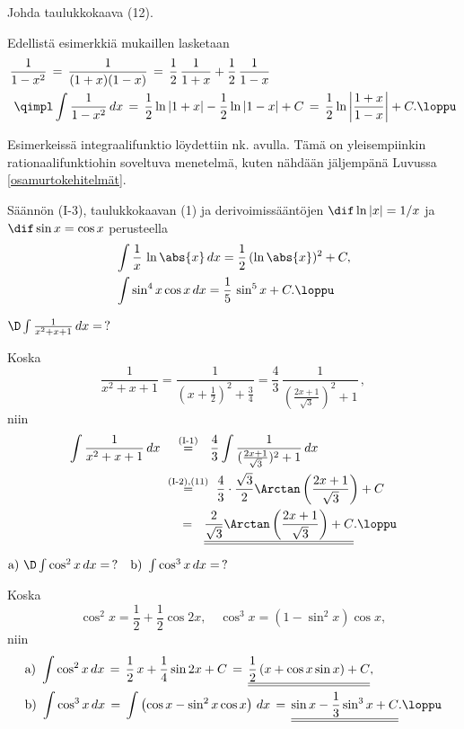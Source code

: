 \begin{Exa} Johda taulukkokaava (12). \end{Exa}
\ratk Edellistä esimerkkiä mukaillen lasketaan
\begin{align*}
&\frac{1}{1-x^2} \,=\, \frac{1}{(1+x)(1-x)}
                \,=\, \frac{1}{2}\,\frac{1}{1+x}+\frac{1}{2}\,\frac{1}{1-x} \\
&\ \qimpl \int\frac{1}{1-x^2}\,dx \,=\, \frac{1}{2}\ln|1+x|-\frac{1}{2}\ln|1-x|+C
                                  \,=\, \frac{1}{2}\ln\left|\frac{1+x}{1-x}\right|+C. \loppu
\end{align*}

Esimerkeissä integraalifunktio löydettiin nk.
%
 avulla. Tämä on
yleisempiinkin rationaalifunktiohin soveltuva menetelmä, kuten nähdään jäljempänä
Luvussa \ref{osamurtokehitelmät}.
\begin{Exa} Säännön (I-3), taulukkokaavan (1) ja derivoimissääntöjen $\dif\ln|x|=1/x$ ja
$\dif\sin x=\cos x$ perusteella
\begin{align*}
&\int \frac{1}{x}\,\ln\abs{x}\,dx = \frac{1}{2}\,(\ln\abs{x})^2 + C, \\
&\int \sin^4 x \cos x\, dx = \frac{1}{5}\,\sin^5 x + C. \loppu
\end{align*}
\end{Exa}
\begin{Exa}
$\D\int\frac{1}{x^2+x+1}\, dx=\,?$
\end{Exa}
\ratk Koska
\[
\frac{1}{x^2+x+1}=\frac{1}{(x+\frac{1}{2})^2+\frac{3}{4}}
                 =\frac{4}{3}\,\frac{1}{(\frac{2x+1}{\sqrt{3}})^2+1}\,,
\]
niin
\begin{align*}
\int\frac{1}{x^2+x+1}\,dx\ 
&\,\ \ \overset{\text{(I-1)}}{=}\ \ 
          \frac{4}{3}\int \frac{1}{(\frac{2x+1}{\sqrt{3}})^2+1}\,dx \\
&\overset{\text{(I-2)},(11)}{=}\ 
          \frac{4}{3}\cdot\frac{\sqrt{3}}{2}\Arctan\left(\frac{2x+1}{\sqrt{3}}\right)+C \\
&\quad\, =\ \ 
 \underline{\underline{\frac{2}{\sqrt{3}}\Arctan\left(\frac{2x+1}{\sqrt{3}}\right)+C}}. \loppu
\end{align*}

\begin{Exa} \label{cos-integraaleja}
$\text{a)}\ \D\int\cos^2 x\, dx=\,? \quad\text{b)}\ \int\cos^3 x\, dx=\,?$
\end{Exa}
\ratk Koska
\[
\cos^2 x=\frac{1}{2}+\frac{1}{2}\cos 2x, \quad \cos^3 x=(1-\sin^2 x)\cos x,
\]
niin
\begin{align*}
&\text{a)}\ \int \cos^2 x\, dx\,=\,\frac{1}{2}\,x+\frac{1}{4}\sin 2x+C\,
                     =\, \underline{\underline{\frac{1}{2}\,(x+\cos x\sin x)+C}}, \\
&\text{b)}\ \int \cos^3 x\, dx\,=\,\int\left(\cos x-\sin^2 x\cos x\right)\,dx\,
                     =\, \underline{\underline{\sin x-\frac{1}{3}\sin^3 x+C}}. \loppu
\end{align*}

